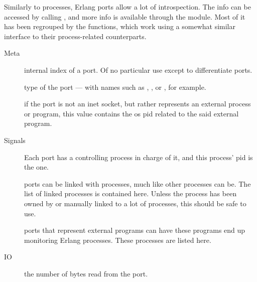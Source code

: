 \documentclass[11pt, oneside]{book}   	%
\begin{document}
Similarly to processes, Erlang ports allow a lot of introspection. The info can be accessed by calling , and more info is available through the  module. Most of it has been regrouped by the  functions, which work using a somewhat similar interface to their process-related counterparts. 

\begin{description*}
	\item[Meta] \hfill
		\begin{description}		
			\item[] internal index of a port. Of no particular use except to differentiate ports.
			
			\item[] type of the port — with names such as , , or , for example.
			
			\item[] if the port is not an inet socket, but rather represents an external process or program, this value contains the os pid related to the said external program.
		\end{description}

	\item[Signals] \hfill
		\begin{description}		
			\item[] Each port has a controlling process in charge of it, and this process' pid is the  one.
			
			\item[] ports can be linked with processes, much like other processes can be. The list of linked processes is contained here. Unless the process has been owned by or manually linked to a lot of processes, this should be safe to use.
			
			\item[] ports that represent external programs can have these programs end up monitoring Erlang processes. These processes are listed here.
		\end{description}
		
	\item[IO] \hfill
		\begin{description}		
			\item[] the number of bytes read from the port.
			

\end{description}
\end{description*}
\end{document}
